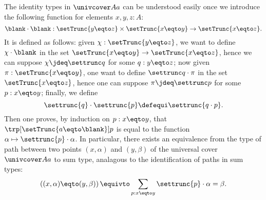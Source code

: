 The identity types in $\univcover A a$ can be understood easily once
we introduce the following function for elements $x,y,z:A$:
\begin{displaymath}
  \blank\cdot\blank : \setTrunc{y\eqto z} \times \setTrunc{x\eqto y} \to \setTrunc{x\eqto z}.
\end{displaymath}
It is defined as follows: given $\chi : \setTrunc{y\eqto z}$, we want to define
$\chi\cdot\blank$ in the set $\setTrunc{x\eqto y} \to \setTrunc{x\eqto z}$,
hence we can suppose $\chi\jdeq\settrunc q$ for some $q:y\eqto z$; now given
$\pi:\setTrunc{x\eqto y}$, one want to define $\settrunc q \cdot \pi$ in the set
$\setTrunc{x\eqto z}$, hence one can suppose $\pi\jdeq\settrunc p$ for some
$p:x\eqto y$; finally, we define
\begin{displaymath}
  \settrunc{q} \cdot \settrunc{p} \defequi \settrunc{q\cdot p}.
\end{displaymath}
Then one proves, by induction on $p:x\eqto y$, that
$\trp[\setTrunc{a\eqto\blank}]p$ is equal to the function
$\alpha\mapsto \settrunc{p}\cdot \alpha$. In particular, there exists an
equivalence from the type of path between two points $(x,\alpha)$ and
$(y,\beta)$ of the universal cover $\univcover A a$ to sum type, analagous to
the identification of paths in sum types:
\begin{equation}
  \label{eq:id-types-universal-cover}%
  \left((x,\alpha) \eqto (y,\beta)\right)
  \equivto \sum_{p:x\eqto y}\settrunc{p} \cdot \alpha = \beta.
\end{equation}

